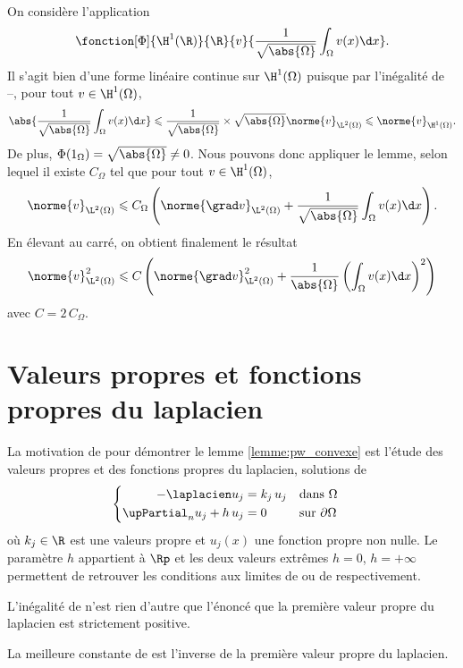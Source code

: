 \begin{demo}
On considère l'application 
\[
\fonction[\Phi]{\H^1(\R)}{\R}{v}{\frac{1}{\sqrt{\abs{\Omega}}} \int_\Omega v(x) \d x}.
\]
Il s'agit bien d'une forme linéaire continue sur $\H^1(\Omega)$ puisque par l'inégalité de --, pour tout $v \in \H^1(\Omega)$, 
\[
\abs{\frac{1}{\sqrt{\abs{\Omega}}} \int_\Omega v(x) \d x} \leqslant \frac{1}{\sqrt{\abs{\Omega}}} \times \sqrt{\abs{\Omega}} \norme{v}_{\L^2(\Omega)} \leqslant \norme{v}_{\H^1(\Omega)}.
\]
De plus, $\Phi(1_\Omega) = \sqrt{\abs{\Omega}} \not= 0$. Nous pouvons donc appliquer le lemme, selon lequel il existe $C_\Omega$ tel que pour tout $v \in \H^1(\Omega)$,
\[
\norme{v}_{\L^2(\Omega)} \leqslant C_\Omega \left( \norme{\grad v}_{\L^2(\Omega)} + \frac{1}{\sqrt{\abs{\Omega}}} \int_\Omega v(x) \d x \right).
\]
En élevant au carré, on obtient finalement le résultat
\[
\norme{v}^2_{\L^2(\Omega)} \leqslant C \left( \norme{\grad v}^2_{\L^2(\Omega)} + \frac{1}{\abs{\Omega}} \left( \int_\Omega v(x) \d x\right)^2 \right)
\]
avec $C = 2 \, C_\Omega$.
\end{demo}


\section{Valeurs propres et fonctions propres du laplacien}

La motivation de  pour démontrer le lemme \ref{lemme:pw_convexe} est l'étude des valeurs propres et des fonctions propres du laplacien, solutions de
\begin{equation}
    \begin{cases}
    \begin{aligned}
        - \laplacien u_j &= k_j \, u_j &&\text{dans } \Omega \\
        \upPartial_n u_j + h \, u_j &= 0 &&\text{sur } \partial \Omega \\
    \end{aligned}
    \end{cases}
\end{equation}
où $k_j \in \R$ est une valeurs propre et $u_j(x)$ une fonction propre non nulle. Le paramètre $h$ appartient à $\Rp$ et les deux valeurs extrêmes $h = 0$, $h = +\infty$ permettent de retrouver les conditions aux limites de  ou de  respectivement. 

\begin{mdframed}
L'inégalité de  n'est rien d'autre que l'énoncé que la première valeur propre du laplacien est strictement positive.
\end{mdframed}
La meilleure constante de  est l'inverse de la première valeur propre du laplacien.

\cite{allaire_recherche_2012}
